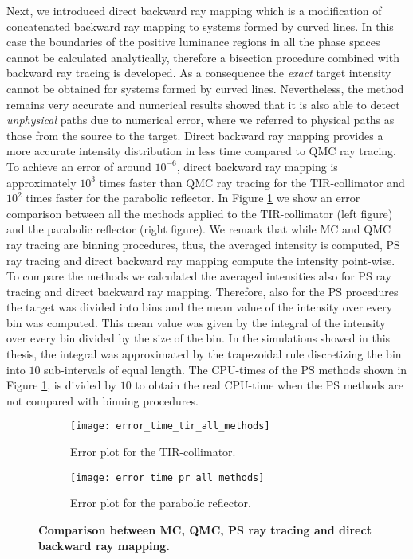 Next, we introduced direct backward ray mapping which is a modification of concatenated backward ray mapping to systems formed by curved lines. In this case the boundaries of the positive luminance regions in all the phase spaces cannot be calculated analytically, therefore a bisection procedure combined with backward ray tracing is developed. As a consequence the \textit{exact} target intensity cannot be obtained for systems formed by curved lines. Nevertheless, the method remains very accurate and numerical results showed that it is also able to detect \textit{unphysical} paths due to numerical error, where we referred to physical paths as those from the source to the target. Direct backward ray mapping provides a more accurate intensity distribution in less time compared to QMC ray tracing. To achieve an error of around $10^{-6}$, direct backward ray mapping is approximately $10^3$ times faster than QMC ray tracing for the TIR-collimator and $10^2$ times faster for the parabolic reflector. In Figure \ref{fig:error_comparison} we show an error comparison between all the methods applied to the TIR-collimator (left figure) and the parabolic reflector (right figure). 
We remark that while MC and QMC ray tracing are binning procedures, thus, the averaged intensity is computed, PS ray tracing and direct backward ray mapping compute the intensity point-wise. To compare the methods we calculated the averaged intensities also for PS ray tracing and direct backward ray mapping. Therefore, also for the PS procedures the target was divided into bins and the mean value of the intensity over every bin was computed. This mean value was given by the integral of the intensity over every bin divided by the size of the bin. In the simulations showed in this thesis, the integral was approximated by the trapezoidal rule discretizing the bin into $10$ sub-intervals of equal length. The CPU-times of the PS methods shown in Figure \ref{fig:error_comparison}, is divided by $10$ to obtain the real CPU-time when the PS methods are not compared with binning procedures.
\begin{figure}[t]
\label{fig:error_comparison}
 \begin{subfigure}[t]{0.49\textwidth}
\centering
    \texttt{[image: error\_time\_tir\_all\_methods]}
    \caption{Error plot for the TIR-collimator.}
\end{subfigure}
\hfill
\begin{subfigure}[t]{0.49\textwidth}
\centering
    \texttt{[image: error\_time\_pr\_all\_methods]}
    \caption{Error plot for the parabolic reflector.}
\end{subfigure}
\caption{\textbf{Comparison between MC, QMC, PS ray tracing and direct backward ray mapping.}}
\label{fig:error_comparison}
\end{figure}
